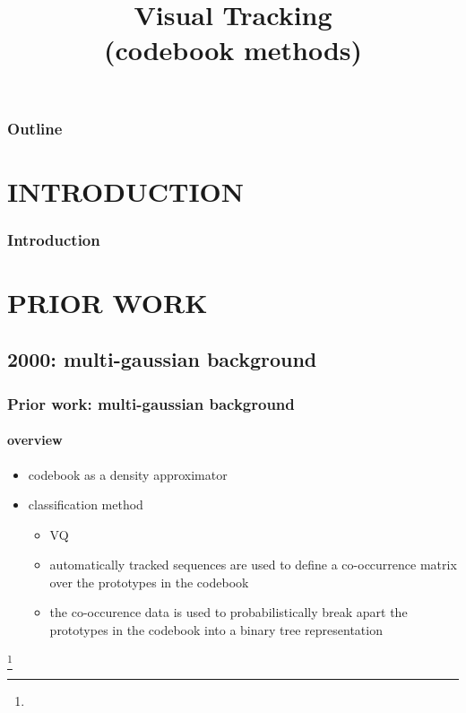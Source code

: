 
\title{Visual Tracking \\ (codebook methods)}
\begin{frame}[plain]\logoTechTower
	\titlepage
\end{frame}

\begin{frame}
\frametitle{Outline}
\logoCSIPCPL\logoTechTower
	\setcounter{tocdepth}{1}	
	\tableofcontents
\end{frame}

\section{INTRODUCTION}
\begin{frame}
\frametitle{Introduction}
\framesubtitle{}
\logoCSIPCPL\mypagenum
\end{frame}

\section{PRIOR WORK}
\subsection{2000: multi-gaussian background}
\begin{frame}
\frametitle{Prior work: multi-gaussian background}
\framesubtitle{overview}
\mypagenum
	\begin{itemize}
		\item codebook as a density approximator
		\item classification method
			\begin{itemize}
				\item VQ
				\item automatically tracked sequences are used to define a co-occurrence matrix over the prototypes in the codebook
				\item the co-occurence data is used to probabilistically break apart the prototypes in the codebook into a binary tree representation
			\end{itemize}
	\end{itemize}
\footnote{\tiny {}}
\end{frame}


